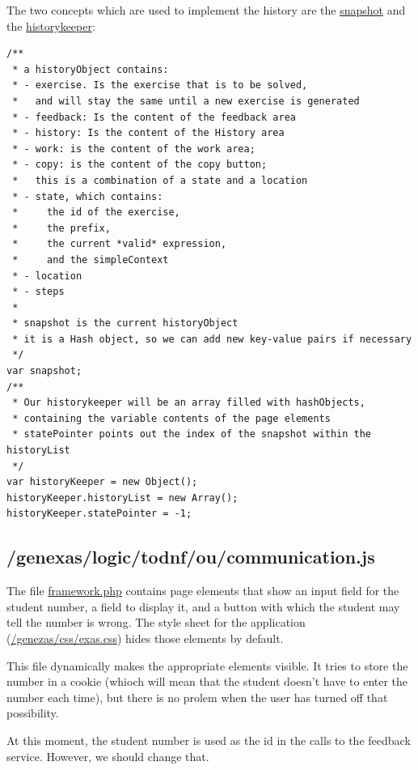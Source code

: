 \documentclass{article}
\begin{document}
The two concepts which are used to implement the history are the \url{snapshot} and the \url{historykeeper}:
\begin{verbatim}
/**
 * a historyObject contains:
 * - exercise. Is the exercise that is to be solved, 
 *   and will stay the same until a new exercise is generated
 * - feedback: Is the content of the feedback area
 * - history: Is the content of the History area
 * - work: is the content of the work area; 
 * - copy: is the content of the copy button; 
 *   this is a combination of a state and a location
 * - state, which contains: 
 *     the id of the exercise, 
 *     the prefix, 
 *     the current *valid* expression, 
 *     and the simpleContext
 * - location
 * - steps
 * 
 * snapshot is the current historyObject
 * it is a Hash object, so we can add new key-value pairs if necessary
 */
var snapshot;
/**
 * Our historykeeper will be an array filled with hashObjects, 
 * containing the variable contents of the page elements
 * statePointer points out the index of the snapshot within the historyList
 */
var historyKeeper = new Object();
historyKeeper.historyList = new Array();
historyKeeper.statePointer = -1;
\end{verbatim}

\subsection{/genexas/logic/todnf/ou/communication.js}
The file \url{framework.php} contains page elements that show an input field for the student number, a field to display it, and a button with which the student may tell the number is wrong. The style sheet for the application (\url{/genezas/css/exas.css}) hides those elements by default.

This file dynamically makes the appropriate elements visible. It tries to store the number in a cookie (whioch will mean that the student doesn't have to enter the number each time), but there is no prolem when the user has turned off that possibility.

At this moment, the student number is used as the id in the calls to the feedback service. However, we should change that.



\end{document}
